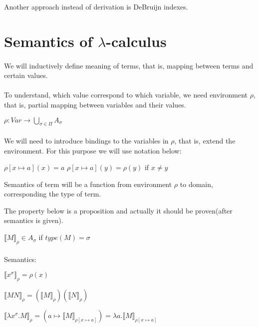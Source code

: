 \documentclass[a4paper,10pt]{book}
\newcommand{\sem}[2]{ \llbracket#1\rrbracket_{#2} }
\begin{document}
Another approach instead of derivation is DeBruijn indexes.

\section{Semantics of $\lambda$-calculus}
\paragraph{}

We will inductively define meaning of terms, that is, mapping between terms and certain values.

\paragraph{}

To understand, which value correspond to which variable, we need environment $ \rho $, that is, partial mapping between variables and their values.

$\rho : Var \rightarrow \bigcup_{\sigma \in \Pi} A_\sigma$

\paragraph{}
We will need to introduce bindings to the variables in $ \rho $, that is, extend the environment. For this purpose we will use notation below:

$\rho[x \mapsto a](x) = a$
$\rho[x \mapsto a](y) = \rho(y) $ if $x \neq y$

Semantics of term will be a function from environment $ \rho $ to domain, corresponding the type of term.

The property below is a proposition and actually it should be proven(after semantics is given).

$\sem{M}{\rho} \in A_\sigma$ if $ type(M) = \sigma $

\paragraph{}

Semantics:

$\sem{x^\sigma}{\rho} = \rho(x)$

$\sem{ MN }{\rho} = (\sem{ M }{\rho}) (\sem{N}{\rho})$

$\sem{\lambda x^\sigma . M}{\rho} = (a \mapsto \sem{M}{\rho[x \mapsto a]}) = \lambda a . \sem{M}{\rho[x \mapsto a]}$
\end{document}
